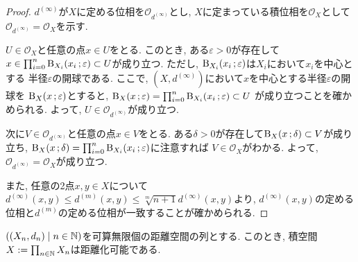 \documentclass[uplatex, dvipdfmx, a4paper, 12pt, class=jsbook, crop=false]{standalone}
\begin{document}
\begin{proof}
	$ d^{(\infty)} $が$ X $に定める位相を$ \mathcal{O}_{d^{(\infty)}} $とし,
	$ X $に定まっている積位相を$ \mathcal{O}_X $として
	$ \mathcal{O}_{d^{(\infty)}} = \mathcal{O}_X $を示す.

	$ U \in \mathcal{O}_X $と任意の点$ x \in U $をとる.
	このとき, ある$ \varepsilon > 0 $が存在して
	$ x \in \prod_{i=0}^n \topballsf{X_i}{x_i}{\varepsilon} \subset U $が成り立つ.
	ただし, $ \topballsf{X_i}{x_i}{\varepsilon} $は$ X_i $において$ x_i $を中心とする
	半径$ \varepsilon $の開球である.
	ここで, $ (X, d^{(\infty)}) $において$ x $を中心とする半径$ \varepsilon $の開球を
	$ \topballsf{X}{x}{\varepsilon} $とすると,
	$ \topballsf{X}{x}{\varepsilon} = \prod_{i=0}^n \topballsf{X_i}{x_i}{\varepsilon} \subset U $
	が成り立つことを確かめられる.
	よって, $ U \in \mathcal{O}_{d^{(\infty)}} $が成り立つ.

	次に$ V \in \mathcal{O}_{d^{(\infty)}} $と任意の点$ x \in V $をとる.
	ある$ \delta > 0 $が存在して$ \topballsf{X}{x}{\delta} \subset V $が成り立ち,
	$ \topballsf{X}{x}{\delta} = \prod_{i=0}^n \topballsf{X_i}{x_i}{\varepsilon} $に注意すれば
	$ V \in \mathcal{O}_X $がわかる.
	よって, $ \mathcal{O}_{d^{(\infty)}} = \mathcal{O}_X $が成り立つ.

	また, 任意の2点$ x, y \in X $について$ d^{(\infty)}(x, y) \leq
	d^{(m)}(x, y) \leq \sqrt[m]{n+1} d^{(\infty)}(x, y)$より,
	$ d^{(\infty)}(x, y) $の定める位相と$ d^{(m)} $の定める位相が一致することが確かめられる.
\end{proof}

\begin{proposition}
	$ \setfamily{(X_n, d_n)}{n \in \N} $を可算無限個の距離空間の列とする.
	このとき, 積空間$ X \mathrel{:=} \prod_{n \in \mathbb{N}} X_n $は距離化可能である.
\end{proposition}
\end{document}
